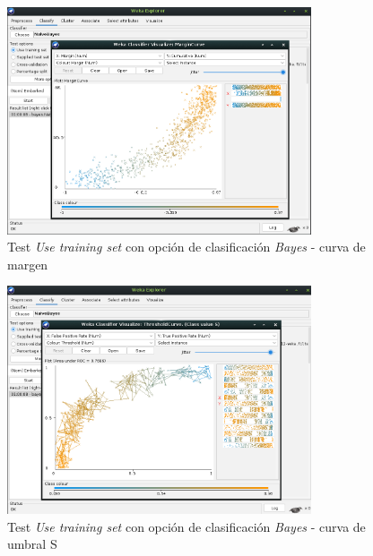 \documentclass[12pt]{article}
\begin{document}
\begin{itemize}
                        \begin{figure}[!h]
                            \centering
                            \includegraphics[width=0.8\textwidth]{img/weka-9.png}
                            \caption{Test \textit{Use training set} con opción de clasificación \textit{Bayes} - curva de margen}
                        \end{figure}

                        \newpage
                        \begin{figure}[!h]
                            \centering
                            \includegraphics[width=0.8\textwidth]{img/weka-10.png}
                            \caption{Test \textit{Use training set} con opción de clasificación \textit{Bayes} - curva de umbral S}
                        \end{figure}


\end{itemize}
\end{document}

